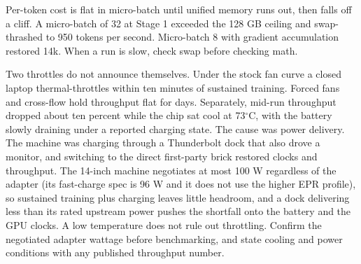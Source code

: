 \documentclass[11pt]{article}
\begin{document}
Per-token cost is flat in micro-batch until unified memory runs out,
then falls off a cliff. A micro-batch of 32 at Stage 1 exceeded the
128 GB ceiling and swap-thrashed to 950 tokens per second. Micro-batch
8 with gradient accumulation restored 14k. When a run is slow, check
swap before checking math.

Two throttles do not announce themselves. Under the stock fan curve a
closed laptop thermal-throttles within ten minutes of sustained
training. Forced fans and cross-flow hold throughput flat for days.
Separately, mid-run throughput dropped about ten percent while the chip
sat cool at 73$^\circ$C, with the battery slowly draining under a
reported charging state. The cause was power delivery. The machine was
charging through a Thunderbolt dock that also drove a monitor, and
switching to the direct first-party brick restored clocks and
throughput. The 14-inch machine negotiates at most 100 W regardless of
the adapter (its fast-charge spec is 96 W and it does not use the
higher EPR profile), so sustained training plus charging leaves little
headroom, and a dock delivering less than its rated upstream power
pushes the shortfall onto the battery and the GPU clocks. A low
temperature does not rule out throttling. Confirm the negotiated
adapter wattage before benchmarking, and state cooling and power
conditions with any published throughput number.



\end{document}
